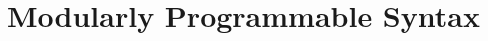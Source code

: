 \documentclass[12pt]{cmuthesis}
\newcommand{\todolater}[1]{{\color{magenta} TODO (Later): #1}}
\newcommand{\todo}[1]{{\color{red} TODO: #1}}
\begin{document}


\tableofcontents
\listoffigures

\mainmatter



%
%
%
%
%






\part{Modularly Programmable Syntax}




\end{document}
